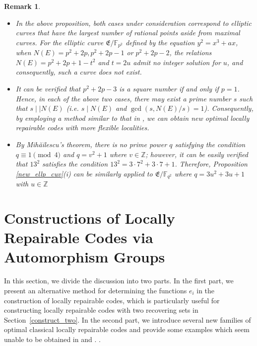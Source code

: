 \documentclass[journal,12pt,onecolumn]{IEEEtran}
\newtheorem{remark}{Remark}
\begin{document}
\begin{remark}\label{new_ellp_cuv_rem}
    \begin{itemize}
        \item[(i)] In the above proposition, both cases under consideration correspond to elliptic curves that have the largest number of rational points aside from maximal curves. For the elliptic curve \( \mathfrak{E}/ \mathbb{F}_{p^2} \) defined by the equation \( y^2 = x^3 + ax \), when \( N(E) = p^2 + 2p, p^2 + 2p - 1\) or \(p^2 + 2p - 2 \), the relations \( N(E) = p^2 + 2p + 1 - t^2 \) and \( t = 2u\) admit no integer solution for \( u \), and consequently, such a curve does not exist.
        \item[(ii)] It can be verified that \( p^2 + 2p - 3 \) is a square number if and only if \( p = 1 \). Hence, in each of the above two cases, there may exist a prime number \( s \) such that \( s \mid\mid N(E) \) (i.e. \( s\mid N(E)\) and \(\gcd(s,N(E)/s) = 1\)). Consequently, by employing a method similar to that in \cite{MA2023105686}, we can obtain new optimal locally repairable codes with more flexible localities. 
        \item[(iii)] By Mihăilescu's theorem\cite{metsankyla_catalans_2004}, there is no prime power \( q \) satisfying the condition \( q \equiv 1 \pmod{4} \) and \(q = v^2 + 1\) where \(v\in\mathbb{Z}\); however, it can be easily verified that \( 13^2 \) satisfies the condition \(13^2 = 3\cdot7^2 + 3\cdot7 + 1\). Therefore, Proposition \ref{new_ellp_cuv}(i) can be similarly applied to \( \mathfrak{E}/\mathbb{F}_{q^2} \) where \(q = 3u^2 + 3u + 1\) with \(u\in\mathbb{Z}\)
    \end{itemize}
\end{remark}















\section{Constructions of Locally Repairable Codes via Automorphism Groups}\label{construct} 

In this section, we divide the discussion into two parts. In the first part, we present an alternative method for determining the functions \( e_i \) in the construction of locally repairable codes, which is particularly useful for constructing locally repairable codes with two recovering sets in Section~\ref{construct_two}. In the second part, we introduce several new families of optimal classical locally repairable codes and provide some examples which seem unable to be obtained in \cite{Optimal_Locally_Repairable_Codes_Via_Elliptic_Curves} and \cite{MA2023105686}. . 
\end{document}
